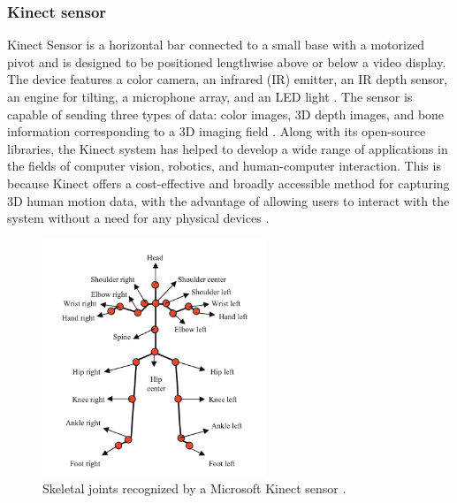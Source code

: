                    \subsubsection{Kinect sensor} 

                        Kinect Sensor is a horizontal bar connected to a small base with a motorized pivot and is designed to be positioned lengthwise above or below a video display. The device features a color camera, an infrared (IR) emitter, an IR depth sensor, an engine for tilting, a microphone array, and an LED light \cite{abbasi_motion_2021}. The sensor is capable of sending three types of data: color images, 3D depth images, and bone information corresponding to a 3D imaging field \cite{zheng_cg-recognizer_2022}\cite{acis_classification_2023}. Along with its open-source libraries, the Kinect system has helped to develop a wide range of applications in the fields of computer vision, robotics, and human-computer interaction. This is because Kinect offers a cost-effective and broadly accessible method for capturing 3D human motion data, with the advantage of allowing users to interact with the system without a need for any physical devices \cite{gowing_kinect_2014}.

                
                        \begin{figure}[H]
                            \centering
                            \includegraphics[width=0.6\textwidth]{./resources/images/kinect/joints.png}
                            \caption{Skeletal joints recognized by a Microsoft Kinect sensor \cite{jais_review_2015}.}
                            \label{fig:kinect_sensor_v2}
                        \end{figure}

